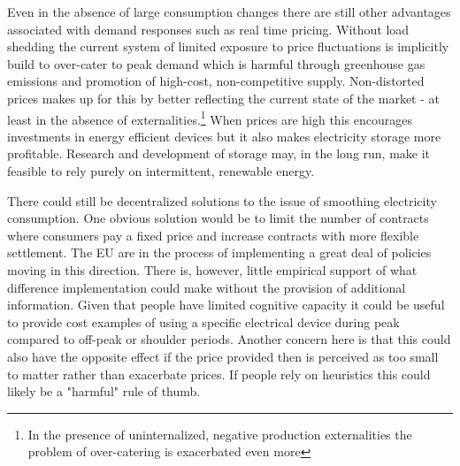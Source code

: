 Even in the absence of large consumption changes there are still other advantages associated with demand responses such as real time pricing. Without load shedding the current system of limited exposure to price fluctuations is implicitly build to over-cater to peak demand which is harmful through greenhouse gas emissions and promotion of high-cost, non-competitive supply. Non-distorted prices makes up for this by better reflecting the current state of the market - at least in the absence of externalities.\footnote{In the presence of uninternalized, negative production externalities the problem of over-catering is exacerbated even more} When prices are high this encourages investments in energy efficient devices but it also makes electricity storage more profitable. Research and development of storage may, in the long run, make it feasible to rely purely on intermittent, renewable energy.
\bigskip

There could still be decentralized solutions to the issue of smoothing electricity consumption. One obvious solution would be to limit the number of contracts where consumers pay a fixed price and increase contracts with more flexible settlement. The EU are in the process of implementing a great deal of policies moving in this direction. There is, however, little empirical support of what difference implementation could make without the provision of additional information. Given that people have limited cognitive capacity it could be useful to provide cost examples of using a specific electrical device during peak compared to off-peak or shoulder periods.
Another concern here is that this could also have the opposite effect if the price provided then is perceived as too small to matter rather than exacerbate prices. If people rely on heuristics this could likely be a "harmful" rule of thumb.
\bigskip


